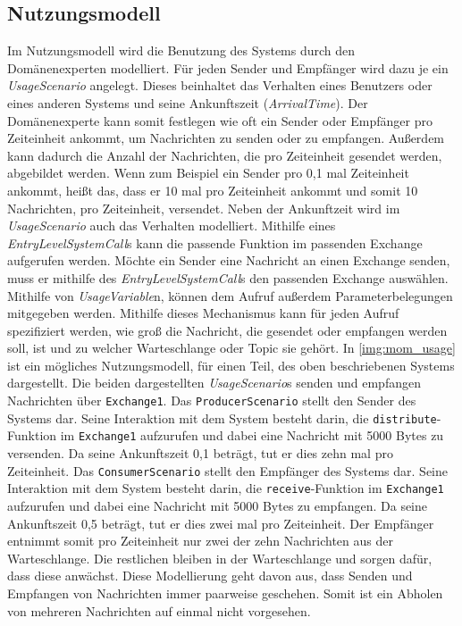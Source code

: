 \subsection{Nutzungsmodell}
Im Nutzungsmodell wird die Benutzung des Systems durch den Domänenexperten modelliert. Für jeden Sender und Empfänger wird dazu je ein \emph{UsageScenario} angelegt. Dieses beinhaltet das Verhalten eines Benutzers oder eines anderen Systems und seine Ankunftszeit (\emph{ArrivalTime}). Der Domänenexperte kann somit festlegen wie oft ein Sender oder Empfänger pro Zeiteinheit ankommt, um Nachrichten zu senden oder zu empfangen. Außerdem kann dadurch die Anzahl der Nachrichten, die pro Zeiteinheit gesendet werden, abgebildet werden. Wenn zum Beispiel ein Sender pro 0,1 mal Zeiteinheit ankommt, heißt das, dass er 10 mal pro Zeiteinheit ankommt und somit 10 Nachrichten, pro Zeiteinheit, versendet. Neben der Ankunftzeit wird im \emph{UsageScenario} auch das Verhalten modelliert. Mithilfe eines \emph{EntryLevelSystemCall}s kann die passende Funktion im passenden Exchange aufgerufen werden. Möchte ein Sender eine Nachricht an einen Exchange senden, muss er mithilfe des \emph{EntryLevelSystemCall}s den passenden Exchange auswählen. Mithilfe von \emph{UsageVariable}n, können dem Aufruf außerdem Parameterbelegungen mitgegeben werden. Mithilfe dieses Mechanismus kann für jeden Aufruf spezifiziert werden, wie groß die Nachricht, die gesendet oder empfangen werden soll, ist und zu welcher Warteschlange oder Topic sie gehört. In \autoref{img:mom_usage} ist ein mögliches Nutzungsmodell, für einen Teil, des oben beschriebenen Systems dargestellt. Die beiden dargestellten \emph{UsageScenario}s senden und empfangen Nachrichten über \texttt{Exchange1}. Das \texttt{ProducerScenario} stellt den Sender des Systems dar. Seine Interaktion mit dem System besteht darin, die \texttt{distribute}-Funktion im \texttt{Exchange1} aufzurufen und dabei eine Nachricht mit 5000 Bytes zu versenden. Da seine Ankunftszeit 0,1 beträgt, tut er dies zehn mal pro Zeiteinheit. Das \texttt{ConsumerScenario} stellt den Empfänger des Systems dar. Seine Interaktion mit dem System besteht darin, die \texttt{receive}-Funktion im \texttt{Exchange1} aufzurufen und dabei eine Nachricht mit 5000 Bytes zu empfangen. Da seine Ankunftszeit 0,5 beträgt, tut er dies zwei mal pro Zeiteinheit. Der Empfänger entnimmt somit pro Zeiteinheit nur zwei der zehn Nachrichten aus der Warteschlange. Die restlichen bleiben in der Warteschlange und sorgen dafür, dass diese anwächst. Diese Modellierung geht davon aus, dass Senden und Empfangen von Nachrichten immer paarweise geschehen. Somit ist ein Abholen von mehreren Nachrichten auf einmal nicht vorgesehen.

